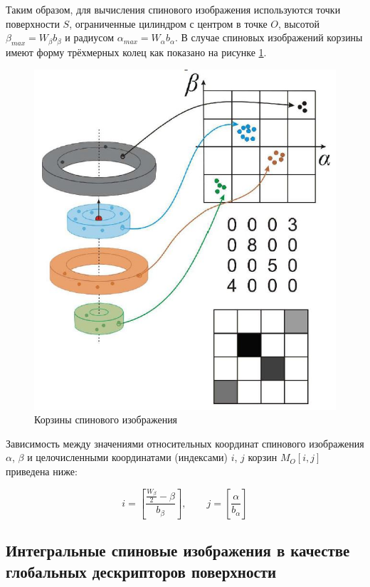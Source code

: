 \documentclass[14pt]{article}
\numberwithin{figure}{section}
\numberwithin{equation}{section}
\begin{document}
Таким образом, для вычисления спинового изображения используются точки поверхности $S$, ограниченные цилиндром с центром в точке $O$, высотой $\beta_{max} = W_{\beta}b_{\beta}$ и радиусом $\alpha_{max} = W_{\alpha} b_{\alpha}$. В случае спиновых изображений корзины имеют форму трёхмерных колец как показано на рисунке \ref{ris:3}.

\begin{figure}[h]
	\begin{center}
		\includegraphics[scale=0.7]{3.JPG}
		\caption{Корзины спинового изображения}
		\label{ris:3}
	\end{center}
\end{figure}


Зависимость между значениями относительных координат спинового изображения $\alpha$, $\beta$ и целочисленными координатами (индексами) $i$, $j$ корзин $M_O[i, j]$ приведена ниже:

\begin{equation}
	i = \left[ \frac{\frac{W_{\beta}}{2} - \beta}{b_{\beta}} \right], \qquad j = \left[ \frac{\alpha}{b_{\alpha}} \right]
\end{equation}

\subsection{Интегральные спиновые изображения в качестве \\ глобальных дескрипторов поверхности}
\end{document}
